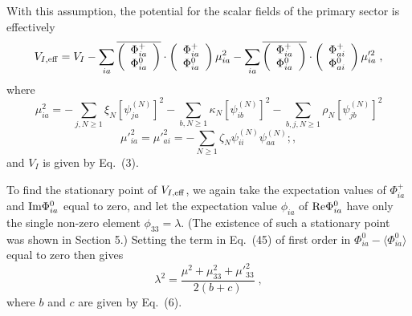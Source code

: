 With this assumption, the potential for the scalar fields of the primary sector is effectively
\begin{equation}
V_{I, {\rm eff}}=V_I - \sum_{ia}\overline{\left(\begin{array}{c}\Phi_{ia}^+ \\ \Phi_{ia}^0\end{array}\right)}\cdot \left(\begin{array}{c}\Phi_{ia}^+ \\ \Phi_{ia}^0\end{array}\right)\mu_{ia}^2-\sum_{ia}\overline{\left(\begin{array}{c}\Phi_{ia}^+ \\ \Phi_{ia}^0\end{array}\right)}\cdot \left(\begin{array}{c}\Phi_{ai}^+ \\ \Phi_{ai}^0\end{array}\right)\mu'^2_{ia}\;,
\end{equation}
where 
\begin{equation}
\mu^2_{ia}=-\sum_{j,N\geq 1}\xi_N[\psi^{(N)}_{ja}]^2-\sum_{b,N\geq 1}\kappa_N[\psi^{(N)}_{ib}]^2-\sum_{b,j,N\geq 1}\rho_N[\psi^{(N)}_{jb}]^2
\end{equation}
\begin{equation}
\mu'^2_{ia}=\mu'^2_{ai}=-\sum_{N\geq 1}\zeta_N\psi^{(N)}_{ii}\psi^{(N)}_{aa};,
\end{equation}
and $V_I$ is given by Eq.~(3).

To find the stationary point of 
$V_{I, {\rm eff}}$, we again take the expectation values of $ \Phi^+_{ia} $ and  $ {\rm Im}\Phi^0_{ia}$ equal to zero, and let the expectation value $\phi_{ia}$ of    ${\rm Re}\Phi^0_{ia} $ have only the single non-zero element $\phi_{33}=\lambda$.  
(The existence of such a stationary point was shown in Section 5.)  Setting the term in Eq.~(45) of first order in $\Phi_{ia}^0-\langle \Phi_{ia}^0\rangle$ equal to zero then gives
\begin{equation}
\lambda^2=\frac{\mu^2+\mu_{33}^2+\mu'^2_{33}}{2(b+c)}\;,
\end{equation}
where $b$ and $c$ are given by Eq.~(6).  


